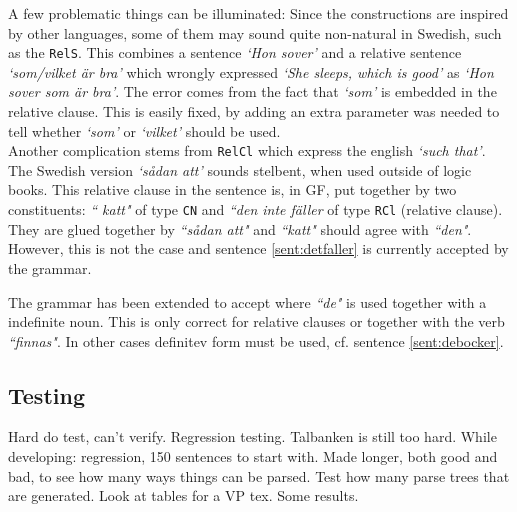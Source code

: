 \documentclass{report}
\begin{document}
A few problematic things can be illuminated:
Since the constructions are inspired by other languages, some of them may sound quite
non-natural in Swedish, such as the \verb|RelS|. This combines a sentence \emph{`Hon sover'}
and a relative sentence \emph{`som/vilket är bra'} which wrongly expressed 
\emph{`She sleeps, which is good'} as
\emph{`Hon sover som är bra'}. The error comes from the fact that \emph{`som'} is
embedded in the relative clause. This is easily fixed, by adding an extra
parameter was needed to tell whether \emph{`som'} or \emph{`vilket'} should be used. \\
Another complication stems from \verb|RelCl| which express the english \emph{`such that'}.
The Swedish version \emph{`sådan att'} sounds stelbent, when used outside of logic books.
This relative clause in the sentence is, in GF, put together by two constituents: \emph{`` katt"}
of type \verb-CN- and \emph{``den inte fäller} of type \verb-RCl- (relative clause). They are
glued together by \emph{``sådan att"} and \emph{``katt"} should agree with \emph{``den"}. 
 \label{sent:detfaller}
However, this is not the case and sentence \ref{sent:detfaller} is currently accepted by the grammar.

The grammar has been extended to accept
where \emph{``de"} is used together with a indefinite noun. This is only correct for 
relative clauses or together with the verb \emph{``finnas"}.
In other cases definitev form must be used, cf. sentence \ref{sent:debocker}.
\label{sent:debocker}


\subsection{Testing}
Hard do test, can't verify. Regression testing. Talbanken is still too hard.
While developing: regression, 150 sentences to start with. Made longer, both good and bad,
to see how many ways things can be parsed.
Test how many parse trees that are generated.
Look at tables for a VP tex.
Some results.
\end{document}
